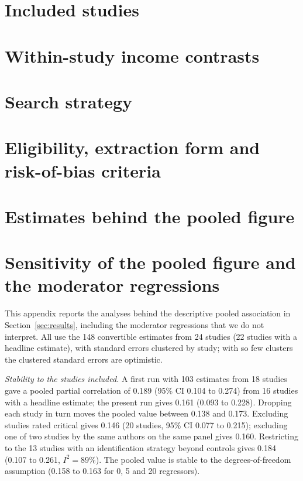 \documentclass[11pt,a4paper]{article}
\begin{document}
\appendix
\section{Included studies}\label{app:studies}


\section{Within-study income contrasts}\label{app:contrasts}


\section{Search strategy}\label{app:search}


\section{Eligibility, extraction form and risk-of-bias criteria}\label{app:criteria}


\section{Estimates behind the pooled figure}\label{app:mra}


\section{Sensitivity of the pooled figure and the moderator regressions}\label{app:sens}
This appendix reports the analyses behind the descriptive pooled association in Section~\ref{sec:results}, including the moderator regressions that we do not interpret. All use the 148 convertible estimates from 24 studies (22 studies with a headline estimate), with standard errors clustered by study; with so few clusters the clustered standard errors are optimistic.

\emph{Stability to the studies included.} A first run with 103 estimates from 18 studies gave a pooled partial correlation of 0.189 (95\% CI 0.104 to 0.274) from 16 studies with a headline estimate; the present run gives 0.161 (0.093 to 0.228). Dropping each study in turn moves the pooled value between 0.138 and 0.173. Excluding studies rated critical gives 0.146 (20 studies, 95\% CI 0.077 to 0.215); excluding one of two studies by the same authors on the same panel gives 0.160. Restricting to the 13 studies with an identification strategy beyond controls gives 0.184 (0.107 to 0.261, $I^2=89\%$). The pooled value is stable to the degrees-of-freedom assumption (0.158 to 0.163 for 0, 5 and 20 regressors).
\end{document}
